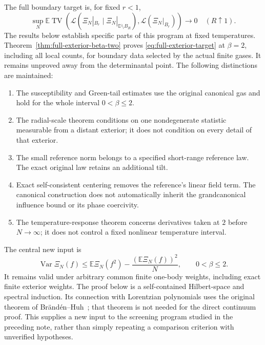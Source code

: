 \documentclass[11pt]{article}
\newcommand{\D}{\mathbb D}
\DeclareMathOperator{\TV}{TV}
\theoremstyle{remark}\newtheorem{remark}[theorem]{Remark}
\begin{document}
The full boundary target is, for fixed $r<1$,
\begin{equation}\label{eq:full-exterior-target}
 \sup_N\mathbb E\TV\left(
  \mathcal L(\Xi_N|_{B_r}\mid\Xi_N|_{\D\setminus B_R}),
  \mathcal L(\Xi_N|_{B_r})\right)\longrightarrow0
       \quad(R\uparrow1).
\end{equation}
The results below establish specific parts of this program at fixed
temperatures. Theorem~\ref{thm:full-exterior-beta-two} proves
\eqref{eq:full-exterior-target} at $\beta=2$, including all local
counts, for boundary data selected by the actual finite gases.
It remains unproved away from the determinantal point.
The following distinctions are maintained:
\begin{enumerate}
\item The susceptibility and Green-tail estimates use the original
canonical gas and hold for the whole interval $0<\beta\le2$.
\item The radial-scale theorem conditions on one nondegenerate
statistic measurable from a distant exterior; it does not condition
on every detail of that exterior.
\item The small reference norm belongs to a specified short-range
reference law. The exact original law retains an additional tilt.
\item Exact self-consistent centering removes the reference's linear
field term. The canonical construction does not automatically
inherit the grandcanonical influence bound or its phase coercivity.
\item The temperature-response theorem concerns derivatives taken
at $2$ before $N\to\infty$; it does not control a fixed nonlinear
temperature interval.
\end{enumerate}

The central new input is
\begin{equation}\label{eq:intro-susceptibility}
 \operatorname{Var}\Xi_N(f)
 \le\mathbb E\Xi_N(f^2)-\frac{(\mathbb E\Xi_N(f))^2}{N},
 \qquad 0<\beta\le2.
\end{equation}
It remains valid under arbitrary common finite one-body weights,
including exact finite exterior weights. The proof below is a
self-contained Hilbert-space and spectral induction. Its connection
with Lorentzian polynomials uses the original theorem of
Br\"and\'en--Huh~\cite{BrandenHuh}; that theorem is not needed for
the direct continuum proof. This supplies a new input to the
screening program studied in the preceding note, rather than simply
repeating a comparison criterion with unverified hypotheses.
\end{document}
